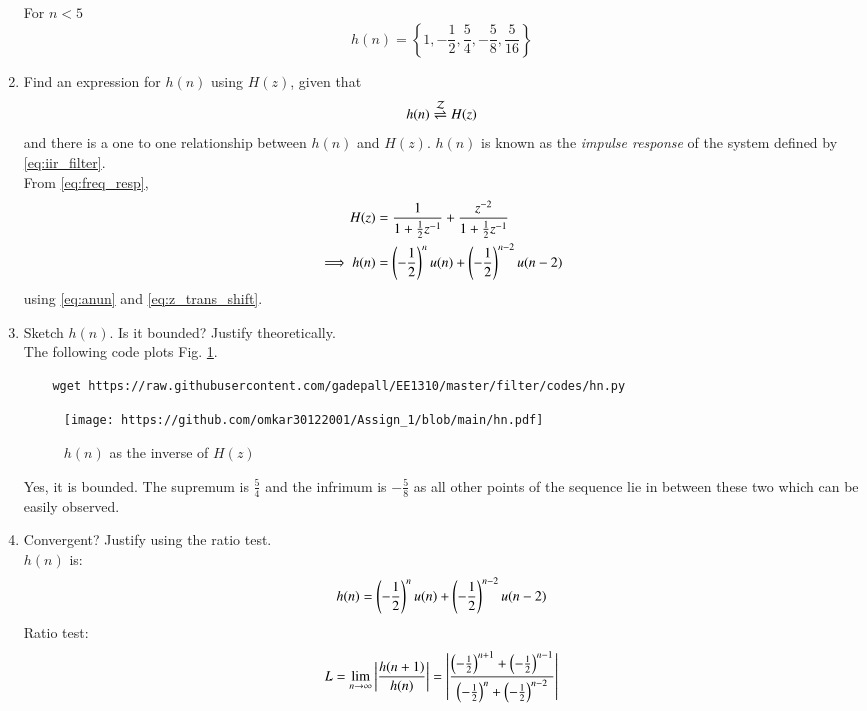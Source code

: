 \documentclass[journal,12pt,twocolumn]{IEEEtran}
\renewcommand\thesection{\arabic{section}}
\begin{document}
\begin{enumerate}[label=\thesection.\arabic*]
For $n < 5$
\begin{equation}
	h(n) = \left\{1, -\frac{1}{2}, \frac{5}{4}, -\frac{5}{8}, \frac{5}{16}\right\}
\end{equation}
\item \label{prob:impulse_resp}
Find an expression for $h(n)$ using $H(z)$, given that 
\begin{equation}
	\label{eq:impulse_resp}
	h(n) \overset{\mathcal{Z}}{ \rightleftharpoons} H(z)
\end{equation}
and there is a one to one relationship between $h(n)$ and $H(z)$. $h(n)$ is known as the {\em impulse response} of the
system defined by \eqref{eq:iir_filter}.
\\
\solution From \eqref{eq:freq_resp},
\begin{align}
	H(z) &= \frac{1}{1 + \frac{1}{2}z^{-1}} + \frac{ z^{-2}}{1 + \frac{1}{2}z^{-1}}
	\\
	\implies h(n) &= \left(-\frac{1}{2}\right)^{n}u(n) + \left(-\frac{1}{2}\right)^{n-2}u(n-2)
\end{align}
using \eqref{eq:anun} and \eqref{eq:z_trans_shift}.
\item Sketch $h(n)$. Is it bounded? Justify theoretically.
\\
\solution The following code plots Fig. \ref{fig:hn}.
\begin{lstlisting}
	wget https://raw.githubusercontent.com/gadepall/EE1310/master/filter/codes/hn.py
\end{lstlisting}
\begin{figure}[!ht]
	\centering
	\texttt{[image: https://github.com/omkar30122001/Assign\_1/blob/main/hn.pdf]}
	\caption{$h(n)$ as the inverse of $H(z)$}
	\label{fig:hn}
\end{figure}
Yes, it is bounded. The supremum is $\frac{5}{4}$ and the infrimum is $-\frac{5}{8}$ as all other points of the sequence lie in between these two which can be easily observed. \\
\item Convergent? Justify using the ratio test. \\
\solution 
$h(n)$ is:
\begin{equation}
	h(n) = \left(-\frac{1}{2}\right)^{n}u(n) + \left(-\frac{1}{2}\right)^{n-2}u(n-2)
\end{equation}
Ratio test:
\begin{equation}
	L = \lim_{n \to \infty}\abs{\frac{h(n+1)}{h(n)}} = \abs{\frac{\brak{-\frac{1}{2}}^{n+1} + \brak{-\frac{1}{2}}^{n-1}}{\brak{-\frac{1}{2}}^{n} + \brak{-\frac{1}{2}}^{n-2}}}

\end{equation}
\end{enumerate}
\end{document}
